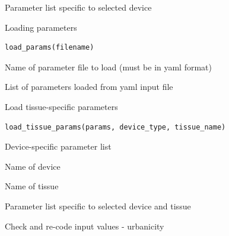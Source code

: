\documentclass[a4paper]{book}
\begin{document}
%
\begin{Value}
Parameter list specific to selected device
\end{Value}
%
\begin{Description}
Loading parameters
\end{Description}
%
\begin{Usage}
\begin{verbatim}
load_params(filename)
\end{verbatim}
\end{Usage}
%
\begin{Arguments}
\begin{ldescription}
\item[\code{filename}] Name of parameter file to load (must be in yaml format)
\end{ldescription}
\end{Arguments}
%
\begin{Value}
List of parameters loaded from yaml input file
\end{Value}
%
\begin{Description}
Load tissue-specific parameters
\end{Description}
%
\begin{Usage}
\begin{verbatim}
load_tissue_params(params, device_type, tissue_name)
\end{verbatim}
\end{Usage}
%
\begin{Arguments}
\begin{ldescription}
\item[\code{params}] Device-specific parameter list

\item[\code{device\_type}] Name of device

\item[\code{tissue\_name}] Name of tissue
\end{ldescription}
\end{Arguments}
%
\begin{Value}
Parameter list specific to selected device and tissue
\end{Value}
%
\begin{Description}
Check and re-code input values - urbanicity
\end{Description}
\end{document}
